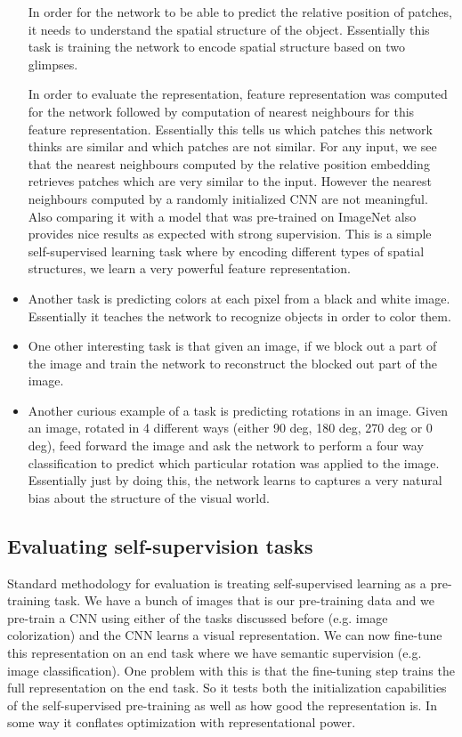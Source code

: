\begin{itemize}
In order for the network to be able to predict the relative position of patches, it needs to understand the spatial structure of the object. Essentially this task is training the network to encode spatial structure based on two glimpses.

In order to evaluate the representation, feature representation was computed for the network followed by computation of nearest neighbours for this feature representation. Essentially this tells us which patches this network thinks are similar and which patches are not similar. For any input, we see that the nearest neighbours computed by the relative position embedding retrieves patches which are very similar to the input. However the nearest neighbours computed by a randomly initialized CNN are not meaningful. Also comparing it with a model that was pre-trained on ImageNet also provides nice results as expected with strong supervision. This is a simple self-supervised learning task where by encoding different types of spatial structures, we learn a very powerful feature representation.

\item Another task is predicting colors at each pixel from a black and white image. Essentially it teaches the network to recognize objects in order to color them. 

\item One other interesting task is that given an image, if we block out a part of the image and train the network to reconstruct the blocked out part of the image. 

\item Another curious example of a task is predicting rotations in an image. Given an image, rotated in 4 different ways (either 90 deg, 180 deg, 270 deg or 0 deg), feed forward the image and ask the network to perform a four way classification to predict which particular rotation was applied to the image. Essentially just by doing this, the network learns to captures a very natural bias about the structure of the visual world.
\end{itemize}{}

\subsection{Evaluating self-supervision tasks}
Standard methodology for evaluation is treating self-supervised learning as a pre-training task. We have a bunch of images that is our pre-training data and we pre-train a CNN using either of the tasks discussed before (e.g. image colorization) and the CNN learns a visual representation. We can now fine-tune this representation on an end task where we have semantic supervision (e.g. image classification). One problem with this is that the fine-tuning step trains the full representation on the end task. So it tests both the initialization capabilities of the self-supervised pre-training as well as how good the representation is. In some way it conflates optimization with representational power.

